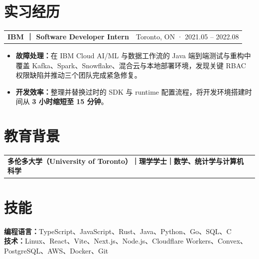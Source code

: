 \documentclass[UTF8,a4paper,11pt,fontset=none]{ctexart}
\makeatletter
\newcommand{\subroleline}[2]{%
  \vspace{-0.35pt}%
  \begin{tabularx}{\textwidth}{@{}Xr@{}}
    {\sffamily\bfseries\fontsize{10.2pt}{11.45pt}\selectfont #1} & {\sffamily\fontsize{8.65pt}{10.1pt}\selectfont #2}
  \end{tabularx}\vspace{-0.2pt}
}
\newcommand{\resumeliststart}{\begin{itemize}[leftmargin=1.42em,label=\textbullet,itemsep=0pt,parsep=0pt,topsep=-0.05pt,partopsep=0pt]}
\newcommand{\resumeitem}[1]{\item\fontsize{10.12pt}{10.68pt}\selectfont\RaggedRight #1}
\newcommand{\resumelistend}{\end{itemize}\vspace{0pt}}
\makeatother
\begin{document}
\section{实习经历}
\subroleline{IBM ｜ Software Developer Intern}{Toronto, ON · 2021.05 -- 2022.08}
\resumeliststart
  \resumeitem{\textsf{\bfseries 故障处理：}在 IBM Cloud AI/ML 与数据工作流的 Java 端到端测试与重构中覆盖 Kafka、Spark、Snowflake、混合云与本地部署环境，发现关键 RBAC 权限缺陷并推动三个团队完成紧急修复。}
  \resumeitem{\textsf{\bfseries 开发效率：}整理并替换过时的 SDK 与 runtime 配置流程，将开发环境搭建时间从 \textbf{3 小时缩短至 15 分钟}。}
\resumelistend

\section{教育背景}
\subroleline{多伦多大学（University of Toronto）｜理学学士｜数学、统计学与计算机科学}{2024.06}

\vspace{-4.2pt}\section{技能}
{\fontsize{9.72pt}{10.64pt}\selectfont
\textbf{编程语言：}TypeScript、JavaScript、Rust、Java、Python、Go、SQL、C\\[0pt]
\textbf{技术：}Linux、React、Vite、Next.js、Node.js、Cloudflare Workers、Convex、PostgreSQL、AWS、Docker、Git}
\end{document}

